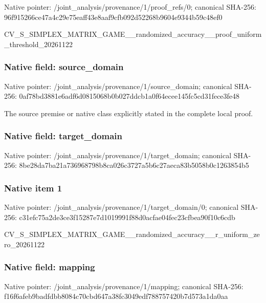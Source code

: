 \documentclass[10pt,a4paper]{article}
\begin{document}
Native pointer: /joint\_analysis/provenan\allowbreak{}ce/1/proof\_refs/0; canonical SHA-256: 96f915266ce47a4c29e75eaf\allowbreak{}f43e8aaf9cfb092d52268b96\allowbreak{}04e9344b59c48ef0


CV\_S\_SIMPLEX\_MATRIX\_GAME\allowbreak{}\_\_randomized\_accuracy\_\_p\allowbreak{}roof\_uniform\_threshold\_2\allowbreak{}0261122


\subsubsection{Native field: source\_domain}


Native pointer: /joint\_analysis/provenan\allowbreak{}ce/1/source\_domain; canonical SHA-256: 0af78bd3881e6adf6d081506\allowbreak{}8b0b027ddcb1a0f64ecee145\allowbreak{}fc5cd31fece3fe48


The source premise or native class explicitly stated in the complete local proof.


\subsubsection{Native field: target\_domain}


Native pointer: /joint\_analysis/provenan\allowbreak{}ce/1/target\_domain; canonical SHA-256: 8be28da7ba21a736968798b8\allowbreak{}ca026c3727a5b6c27aeca83b\allowbreak{}5058b0c1263854b5



\subsubsection{Native item 1}


Native pointer: /joint\_analysis/provenan\allowbreak{}ce/1/target\_domain/0; canonical SHA-256: c31efc75a2de3ce3f15287e7\allowbreak{}d1019991f88d0acfae04fec2\allowbreak{}3cfbea90f10c6cdb


CV\_S\_SIMPLEX\_MATRIX\_GAME\allowbreak{}\_\_randomized\_accuracy\_\_r\allowbreak{}\_uniform\_zero\_20261122


\subsubsection{Native field: mapping}


Native pointer: /joint\_analysis/provenance/1/mapping; canonical SHA-256: f16f6afeb9badfdbb8084c70\allowbreak{}cbd647a38fc3049edf788757\allowbreak{}420b7d573a1da0aa
\end{document}
